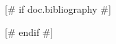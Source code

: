 \documentclass[qe,nameyear,draft]{econsocart}
[# else #]
\begin{document}


[# if doc.bibliography #]

[# endif #]

\end{document}
